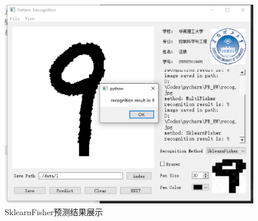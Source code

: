 \documentclass[UTF8, a4paper, 12pt]{report}
\begin{document}
		\begin{figure}[!h]
		\centering
		\includegraphics[scale=0.4]{./img/Predict3.eps}
		\caption{SklearnFisher预测结果展示}
		\label{fig:5.3}
		\end{figure}

\clearpage
\end{document}
